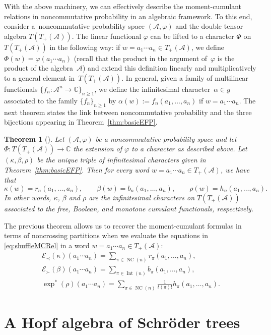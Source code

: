 \documentclass[11pt]{article}
\numberwithin{equation}{section}
\numberwithin{equation}{section}
\newtheorem{Theorem}{Theorem}[section]
\newcommand{\A}{\mathcal{A}}
\newcommand{\NC}{\operatorname{NC}}
\newcommand{\Int}{\operatorname{Int}}
\newcommand{\Expl}{\mathcal{E}_\prec}
\newcommand{\Expr}{\mathcal{E}_\succ}
\begin{document}
 With the above machinery, we can effectively describe the moment-cumulant relations in noncommutative probability in an algebraic framework. To this end, consider a~noncommutative probability space $(\A,\varphi)$ and the double tensor algebra $T(T_+(\A))$. The linear functional $\varphi$ can be lifted to a character $\Phi$ on $T(T_+(\A))$ in the following way: if $w = a_1\cdots a_n \in T_+(\A)$, we define $\Phi(w) = \varphi(a_1\cdots a_n)$ (recall that the product in the argument of~$\varphi$ is the product of the algebra~$\A$) and extend this definition linearly and multiplicatively to a general element in~$T(T_+(\A))$. In general, given a family of multilinear functionals $\{f_n\colon \A^n\to \mathbb{C} \}_{n\geq1}$, we define the infinitesimal character~$\alpha \in g$ associated to the family $\{f_n\}_{n\geq1}$ by $\alpha(w) := f_n(a_1,\dots,a_n)$ if $w= a_1\cdots a_n$. The next theorem states the link between noncommutative probability and the three bijections appearing in Theorem~\ref{thm:basicEFP}.

\begin{Theorem}[\cite{EFP1,EFP3}]\label{thm:linkNCP}
Let $(\A,\varphi)$ be a noncommutative probability space and let $\Phi\colon T(T_+(\A)) \allowbreak \to \mathbb{C}$ the extension of $\varphi$ to a character as described above. Let $(\kappa,\beta,\rho)$ be the unique triple of infinitesimal characters given in Theorem~{\rm \ref{thm:basicEFP}}. Then for every word $w = a_1\cdots a_n \in T_+(\A)$, we have that
\[
	\kappa(w) = r_n(a_1,\dots,a_n),
	\qquad
	\beta(w) = b_n(a_1,\dots,a_n),
	\qquad
	\rho(w) = h_n(a_1,\dots,a_n).
\]
In other words, $\kappa$, $\beta$ and $\rho$ are the infinitesimal characters on $T(T_+(\A))$ associated to the free, Boolean, and monotone cumulant functionals, respectively.
\end{Theorem}
The previous theorem allows us to recover the moment-cumulant formulas in terms of noncrossing partitions when we evaluate the equations in \eqref{eq:shuffleMCRel} in a word $w= a_1\cdots a_n\in T_+(\A)$:
\begin{gather*}
	\Expl(\kappa)(a_1\cdots a_n)
	= \sum_{\pi\in \NC(n)} r_\pi(a_1,\dots,a_n),\\
	\Expr(\beta)(a_1\cdots a_n)
	= \sum_{\pi\in \Int(n)} b_\pi(a_1,\dots,a_n),\\
	\exp^*(\rho)(a_1\cdots a_n)
	= \sum_{\pi\in \NC(n)} \frac{1}{t(\pi)!}h_\pi(a_1,\dots,a_n).
\end{gather*}


\section{A Hopf algebra of Schr\"oder trees}\label{sec:schroder}
\end{document}
